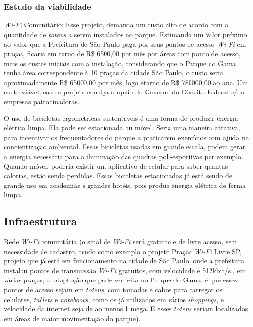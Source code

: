 \subsubsection{Estudo da viabilidade}

\textit{Wi-Fi} Comunit\'ario: Esse projeto, demanda um custo alto de acordo com a quantidade de \textit{totens} a serem instalados no parque. Estimando um valor pr\'oximo ao valor que a Prefeitura de S\~ao Paulo paga por seus pontos de acesso \textit{Wi-Fi} em pra\c{c}as, ficaria em torno de R\$ 6500,00 por m\^es por \'areas com ponto de acesso, mais os custos iniciais com a instala\c{c}\~ao, considerando que o Parque do Gama tenha \'area correspondente \`a 10 pra\c{c}as da cidade S\~ao Paulo, o custo seria aproximadamente R\$ 65000,00 por m\^es, logo etorno de R\$ 780000,00 ao ano. Um custo vi\'avel, caso o projeto consiga o apoio do Governo do Distrito Federal e/ou empresas patrocinadoras.

	O uso de bicicletas ergom\'etricas sustent\'aveis \'e uma forma de produzir energia el\'etrica limpa. Ela pode ser estacionada ou m\'ovel. Seria uma maneira atrativa, para incentivar os frequentadores do parque a praticarem exerc\'icios com ajuda na concientiza\c{c}\~ao ambiental. Essas bicicletas usadas em grande escala, podem gerar a energia necess\'aria para a ilumina\c{c}\~ao das quadras poli-esportivas por exemplo. Quando m\'ovel, poderia existir um aplicativo de celular para saber quantas calorias, est\~ao sendo perdidas. Essas bicicletas estacionadas j\'a est\'a sendo de grande uso em academias e grandes hot\'eis, pois produz energia el\'etrica de forma limpa.

\subsection{Infraestrutura}

Rede \textit{Wi-Fi} comunit\'aria (o sinal de \textit{Wi-Fi} ser\'a gratuito e de livre acesso, sem necessidade de cadastro, tendo como exemplo o projeto Pra\c{c}as \textit{Wi-Fi} Livre SP, projeto que j\'a est\'a em funcionamento na cidade de S\~ao Paulo, onde a prefeitura instalou pontos de transmiss\~ao \textit{Wi-Fi} gratuitos, com velocidade e 512kbit/s , em v\'arias pra\c{c}as, a adapta\c{c}\~ao que pode ser feita no Parque do Gama, \'e que esses pontos de acesso sejam em \textit{totens}, com tomadas e cabos para carregar os celulares, \textit{tablets} e \textit{notebooks}, como os j\'a utilizados em v\'arios \textit{shoppings}, e velocidade da internet seja de ao menos 1 mega. E esses \textit{totens} seriam localizados em \'areas de maior movimenta\c{c}\~ao do parque). 